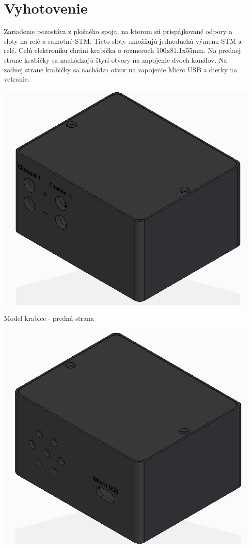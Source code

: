 \documentclass[main.tex]{subfiles}
\begin{document}
	\section{Vyhotovenie}
		\begin{multicols*}{2}
			\noindent Zariadenie pozostáva z plošného spoja, na ktorom sú prispájkované odpory a sloty na relé a samotné STM. Tieto sloty umožňujú jednoduchú výmenu STM a relé. Celú elektroniku chráni krabička o rozmeroch 100x81.1x55mm. Na prednej strane krabičky sa nachádzajú štyri otvory na zapojenie dvoch kanálov. Na zadnej strane krabičky sa nachádza otvor na zapojenie Micro USB a dierky na vetranie.
			
			\begin{figurehere}
				\centering
				\includegraphics[width=\linewidth]{../Obrazky/Box01}
				\caption{Model krabice - predná strana}
				\label{fig:krabicaPredok}
			\end{figurehere}
			\begin{figurehere}
				\centering
				\includegraphics[width=\linewidth]{../Obrazky/Box02}

\end{figurehere}
\end{multicols*}
\end{document}
